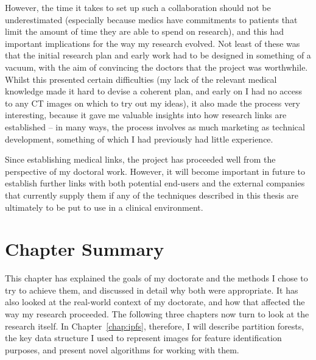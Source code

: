 However, the time it takes to set up such a collaboration should not be underestimated (especially because medics have commitments to patients that limit the amount of time they are able to spend on research), and this had important implications for the way my research evolved. Not least of these was that the initial research plan and early work had to be designed in something of a vacuum, with the aim of convincing the doctors that the project was worthwhile. Whilst this presented certain difficulties (my lack of the relevant medical knowledge made it hard to devise a coherent plan, and early on I had no access to any CT images on which to try out my ideas), it also made the process very interesting, because it gave me valuable insights into how research links are established -- in many ways, the process involves as much marketing as technical development, something of which I had previously had little experience.

Since establishing medical links, the project has proceeded well from the perspective of my doctoral work. However, it will become important in future to establish further links with both potential end-users and the external companies that currently supply them if any of the techniques described in this thesis are ultimately to be put to use in a clinical environment.


\newpage

\section{Chapter Summary}

This chapter has explained the goals of my doctorate and the methods I chose to try to achieve them, and discussed in detail why both were appropriate. It has also looked at the real-world context of my doctorate, and how that affected the way my research proceeded. The following three chapters now turn to look at the research itself. In Chapter~\ref{chap:ipfs}, therefore, I will describe partition forests, the key data structure I used to represent images for feature identification purposes, and present novel algorithms for working with them.
